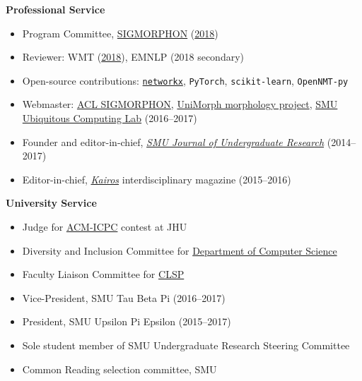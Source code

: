\documentclass[margin, 10pt]{res} %
\newcommand{\clsp}{\href{https://www.clsp.jhu.edu}{CLSP}}
\begin{document}
\begin{resume}
\begin{itemize}
\end{itemize}

\textbf{Professional Service}

\begin{itemize}[noitemsep]
\item Program Committee,  \href{https://sigmorphon.github.io}{SIGMORPHON} (\href{https://sigmorphon.github.io/workshops/2018/}{2018})
\item Reviewer: WMT (\href{http://www.statmt.org/wmt18/}{2018}), EMNLP (2018 secondary)
\item Open-source contributions: \href{http://networkx.github.io}{\texttt{networkx}}, \texttt{PyTorch}, \texttt{scikit-learn}, \texttt{OpenNMT-py}
\item Webmaster: \href{https://sigmorphon.github.io}{ACL SIGMORPHON}, \href{https://unimorph.github.io}{UniMorph morphology project}, \href{http://ubicomp.lyle.smu.edu}{SMU Ubiquitous Computing Lab} (2016--2017)
\item Founder and editor-in-chief, \href{https://smuresearch.wordpress.com/journal/}{\emph{SMU Journal of Undergraduate Research}} (2014--2017)
\item Editor-in-chief, \href{https://smuresearch.wordpress.com/kairos/}{\emph{Kairos}} interdisciplinary magazine (2015--2016)
\end{itemize}


\textbf{University Service}

\begin{itemize}[noitemsep]
\item Judge for \href{https://en.wikipedia.org/wiki/ACM_International_Collegiate_Programming_Contest}{ACM-ICPC} contest at JHU
\item Diversity and Inclusion Committee for \href{https://www.cs.jhu.edu}{Department of Computer Science}
\item Faculty Liaison Committee for \clsp
\item Vice-President, SMU Tau Beta Pi (2016--2017)
\item President, SMU Upsilon Pi Epsilon (2015--2017)
\item Sole student member of SMU Undergraduate Research Steering Committee
\item Common Reading selection committee, SMU
\end{itemize}


\end{resume}
\end{document}
